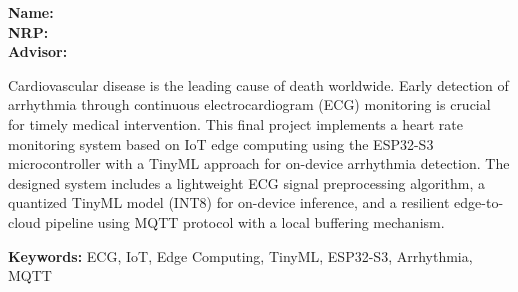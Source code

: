 \vspace{0.3cm}

\noindent
\textbf{\MakeUppercase{\JudulPA}}

\vspace{0.3cm}

\noindent
\textbf{Name\hspace{1.2cm}: \NamaMahasiswa}\\
\textbf{NRP\hspace{1.45cm}: \NRP}\\
\textbf{Advisor\hspace{0.7cm}: \PembimbingSatu}\\
\textbf{\hspace{2.40cm} \PembimbingDua}

\vspace{0.3cm}

Cardiovascular disease is the leading cause of death worldwide. Early detection of arrhythmia through continuous electrocardiogram (ECG) monitoring is crucial for timely medical intervention. This final project implements a heart rate monitoring system based on IoT edge computing using the ESP32-S3 microcontroller with a TinyML approach for on-device arrhythmia detection. The designed system includes a lightweight ECG signal preprocessing algorithm, a quantized TinyML model (INT8) for on-device inference, and a resilient edge-to-cloud pipeline using MQTT protocol with a local buffering mechanism.

\vspace{0.5cm}
\noindent
\textbf{Keywords:} ECG, IoT, Edge Computing, TinyML, ESP32-S3, Arrhythmia, MQTT

\clearpage
